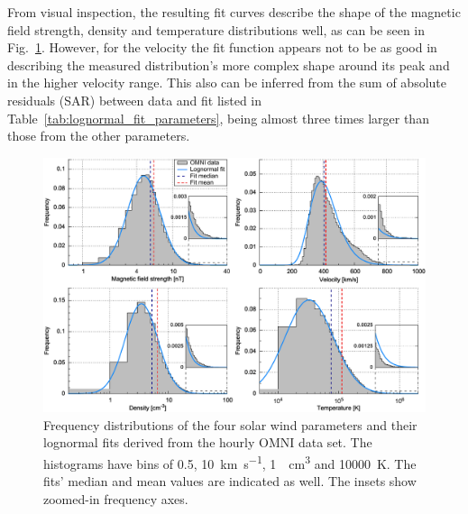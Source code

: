 From visual inspection, the resulting fit curves describe the shape of the magnetic field strength, density and temperature distributions well, as can be seen in Fig.~\ref{fig:histogram_fits_4_a_zoom_paper_pdfplot}. However, for the velocity the fit function appears not to be as good in describing the measured distribution’s more complex shape around its peak and in the higher velocity range. This also can be inferred from the sum of absolute residuals (SAR) between data and fit listed in Table~\ref{tab:lognormal_fit_parameters}, being almost three times larger than those from the other parameters.
\begin{figure}
	\includegraphics[width=18cm]{figures/histogram_fits_4_a_zoom_paper_pdfplot.pdf}
	\caption{Frequency distributions of the four solar wind parameters and their lognormal fits derived from the hourly OMNI data set. The histograms have bins of \SI{0.5}{\nT}, \SI{10}{\km\per\s}, \SI{1}{\per\cm\cubed} and \SI{10000}{\K}. The fits' median and mean values are indicated as well. The insets show zoomed-in frequency axes.}
	\label{fig:histogram_fits_4_a_zoom_paper_pdfplot}
\end{figure}

